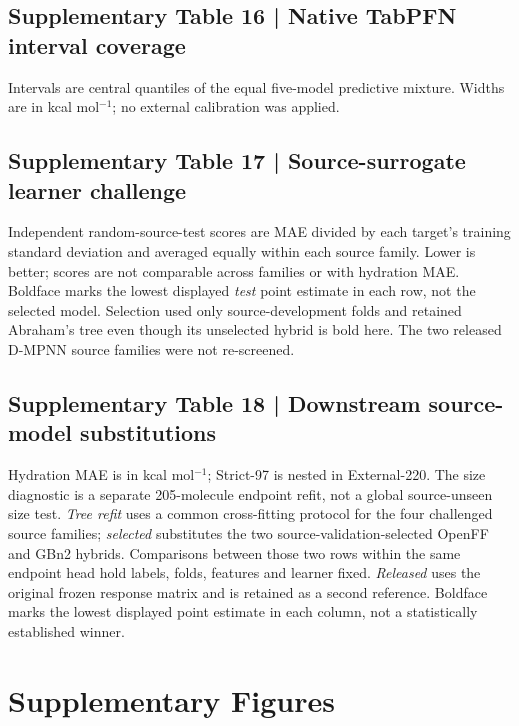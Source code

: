 \subsection*{Supplementary Table 16 | Native TabPFN interval coverage}
\small
Intervals are central quantiles of the equal five-model predictive mixture.
Widths are in kcal mol$^{-1}$; no external calibration was applied.

\normalsize

\clearpage
\subsection*{Supplementary Table 17 | Source-surrogate learner challenge}
\small
Independent random-source-test scores are MAE divided by each target's training
standard deviation and averaged equally within each source family. Lower is
better; scores are not comparable across families or with hydration MAE.
Boldface marks the lowest displayed \emph{test} point estimate in each row, not
the selected model. Selection used only source-development folds and retained
Abraham's tree even though its unselected hybrid is bold here. The two released
D-MPNN source families were not re-screened.
\par\smallskip\noindent

\normalsize

\subsection*{Supplementary Table 18 | Downstream source-model substitutions}
\small
Hydration MAE is in kcal mol$^{-1}$; Strict-97 is nested in External-220.
The size diagnostic is a separate 205-molecule endpoint refit, not a global
source-unseen size test. \emph{Tree refit} uses a common cross-fitting protocol
for the four challenged source families; \emph{selected} substitutes the two
source-validation-selected OpenFF and GBn2 hybrids. Comparisons between those
two rows within the same endpoint head hold labels, folds, features and learner
fixed. \emph{Released} uses the original frozen response matrix and is retained
as a second reference. Boldface marks the lowest displayed point estimate in
each column, not a statistically established winner.
\par\smallskip\noindent

\normalsize

\clearpage
\section*{Supplementary Figures}

